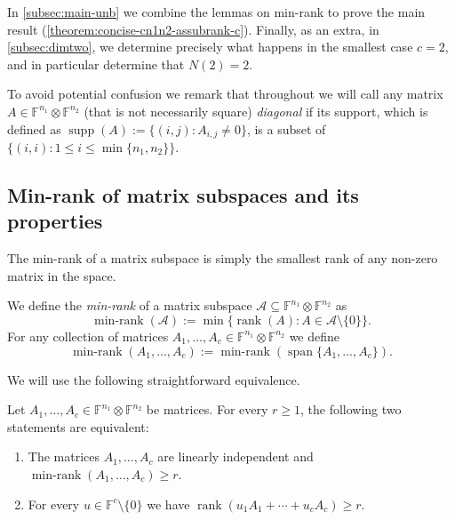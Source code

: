 \documentclass{daj}
\DeclareMathOperator{\supp}{supp}
\newcommand{\FF}{\mathbb{F}}
\DeclareMathOperator{\linspan}{span}
\DeclareMathOperator{\rank}{rank} \DeclareMathOperator{\col}{colspan}
\DeclareMathOperator{\minrnk}{min-rank}
\begin{document}
In \autoref{subsec:main-unb} we combine the lemmas on min-rank to prove the main result (\autoref{theorem:concise-cn1n2-assubrank-c}). Finally, as an extra, in \autoref{subsec:dimtwo}, we determine precisely what happens in the smallest case $c = 2$, and in particular determine that $N(2) = 2$.

%

To avoid potential confusion we remark that throughout we will call any matrix $A\in \FF^{n_1} \otimes \FF^{n_2}$ (that is not necessarily square) \emph{diagonal} if its support, which is defined as $\supp(A) := \{(i,j) : A_{i,j} \neq 0\}$, is a subset of $\{(i,i): 1\leq i\leq \min\{n_1, n_2\}\}$.
%

%
%


\subsection{Min-rank of matrix subspaces and its properties}\label{subsec:minrank} %
%
%

%
\newcommand{\StrExC}{T_{\textnormal{NA},c,n}}
%
%
%
%
%
%
%

%
%
%

%

%

%

%
The min-rank of a matrix subspace is simply the smallest rank of any non-zero matrix in the space. 


\begin{definition}
    We define the \emph{min-rank} of a matrix subspace $\mathcal{A} \subseteq \FF^{n_1} \otimes \FF^{n_2}$ as
    \[
    \minrnk(\mathcal{A}):=\min\{\rank(A):A\in\mathcal{A}\setminus\{0\}\}.
    \]
    For any collection of matrices $A_1,
    \ldots,A_c \in \FF^{n_1} \otimes \FF^{n_2}$ we define \[
    \minrnk(A_1,\dots,A_c):=\minrnk(\linspan\{A_1,\dots,A_c\}).
    \]
\end{definition}



%
%
%

%
%
%
%

We will use the following straightforward equivalence. %

\begin{lemma}\label{lem:minrank-nontrivial-lin-comb}
    Let $A_1,\dots,A_c \in \FF^{n_1} \otimes \FF^{n_2}$ be matrices. %
    For every $r\geq1$, the following two statements are equivalent:
    \begin{enumerate}[\upshape(a)]
        \item The matrices $A_1,\dots,A_c$ are linearly independent and $\minrnk(A_1,\dots,A_c)\geq r$.
        \item For every $u \in \FF^c \setminus \{0\}$ we have $\rank(u_1 A_1 + \cdots + u_c A_c) \geq r$.
    \end{enumerate} 
\end{lemma}
\end{document}

